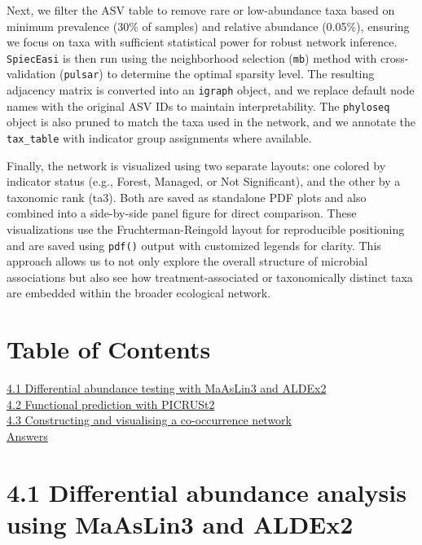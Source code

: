 \documentclass[
]{book}
\begin{document}
Next, we filter the ASV table to remove rare or low-abundance taxa based on minimum prevalence (30\% of samples) and relative abundance (0.05\%), ensuring we focus on taxa with sufficient statistical power for robust network inference. \texttt{SpiecEasi} is then run using the neighborhood selection (\texttt{mb}) method with cross-validation (\texttt{pulsar}) to determine the optimal sparsity level. The resulting adjacency matrix is converted into an \texttt{igraph} object, and we replace default node names with the original ASV IDs to maintain interpretability. The \texttt{phyloseq} object is also pruned to match the taxa used in the network, and we annotate the \texttt{tax\_table} with indicator group assignments where available.

Finally, the network is visualized using two separate layouts: one colored by indicator status (e.g., Forest, Managed, or Not Significant), and the other by a taxonomic rank (ta3). Both are saved as standalone PDF plots and also combined into a side-by-side panel figure for direct comparison. These visualizations use the Fruchterman-Reingold layout for reproducible positioning and are saved using \texttt{pdf()} output with customized legends for clarity. This approach allows us to not only explore the overall structure of microbial associations but also see how treatment-associated or taxonomically distinct taxa are embedded within the broader ecological network.

\section{Table of Contents}\label{table-of-contents-2}

\hyperref[41-Differential-abundance-analysis-using-MaAsLin3-and-ALDEx2]{4.1 Differential abundance testing with MaAsLin3 and ALDEx2}\\
\hyperref[42-Functional-prediction-with-PICRUSt2]{4.2 Functional prediction with PICRUSt2}\\
\hyperref[43-Constructing-and-visualising-a-co-occurrence-network]{4.3 Constructing and visualising a co-occurrence network}\\
\hyperref[answers]{Answers}

\section{4.1 Differential abundance analysis using MaAsLin3 and ALDEx2}\label{differential-abundance-analysis-using-maaslin3-and-aldex2}
\end{document}
